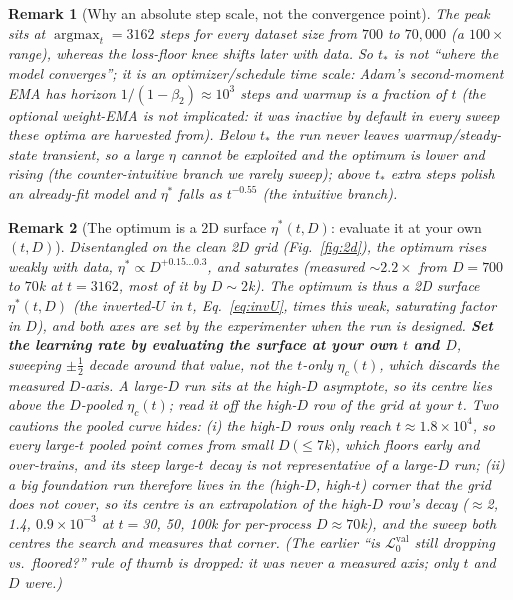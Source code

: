\documentclass[11pt]{article}
\newcommand{\vlnr}{\mathcal{L}^{\mathrm{val}}_{0}}   %
\newcommand{\tstar}{t_\ast}
\newtheorem{remark}{Remark}
\begin{document}
\begin{remark}[Why an absolute step scale, not the convergence point]
The peak sits at $\operatorname{argmax}_t = 3162$ steps for \emph{every} dataset size from
$700$ to $70{,}000$ (a $100\times$ range), whereas the loss-floor knee shifts \emph{later}
with data. So $\tstar$ is not ``where the model converges''; it is an optimizer/schedule
time scale: Adam's second-moment EMA has horizon $1/(1-\beta_2)\approx10^{3}$ steps and warmup
is a fraction of $t$ (the optional weight-EMA is \emph{not} implicated: it was inactive by
default in every sweep these optima are harvested from). Below
$\tstar$ the run never leaves warmup/steady-state transient, so a large $\eta$ cannot be
exploited and the optimum is \emph{lower} and rising (the counter-intuitive branch we rarely
sweep); above $\tstar$ extra steps polish an already-fit model and $\eta^\ast$ falls as
$t^{-0.55}$ (the intuitive branch).
\end{remark}

\begin{remark}[The optimum is a 2D surface $\eta^\ast(t,D)$: evaluate it at your own $(t,D)$]
Disentangled on the clean 2D grid (Fig.~\ref{fig:2d}), the optimum rises \emph{weakly} with
data, $\eta^\ast\propto D^{+0.15\ldots0.3}$, and \emph{saturates} (measured $\sim\!2.2\times$ from
$D=700$ to $70$k at $t=3162$, most of it by $D\!\sim\!2$k). The optimum is thus a 2D surface
$\eta^\ast(t,D)$ (the inverted-$U$ in $t$, Eq.~\eqref{eq:invU}, times this weak, saturating
factor in $D$), and both axes are set by the experimenter when the run is designed.
\textbf{Set the learning rate by evaluating the surface at your own $t$ and $D$}, sweeping
$\pm\tfrac12$ decade around that value, not the $t$-only $\eta_c(t)$, which discards the
measured $D$-axis. A large-$D$ run sits at the high-$D$ asymptote, so its centre lies
\emph{above} the $D$-pooled $\eta_c(t)$; read it off the high-$D$ row of the grid at your $t$.
Two cautions the pooled curve hides: (i) the high-$D$ rows only reach $t\approx1.8\times10^{4}$,
so every large-$t$ pooled point comes from \emph{small} $D\ (\le7$k$)$, which floors early and
over-trains, and its steep large-$t$ decay is not representative of a large-$D$ run; (ii) a big
foundation run therefore lives in the (high-$D$, high-$t$) corner that the grid does not cover,
so its centre is an \emph{extrapolation} of the high-$D$ row's decay ($\approx$2, 1.4,
$0.9\times10^{-3}$ at $t=$30, 50, 100k for per-process $D\!\approx\!70$k), and the sweep both
centres the search and \emph{measures} that corner. (The earlier ``is $\vlnr$ still dropping
vs.\ floored?'' rule of thumb is dropped: it was never a measured axis; only $t$ and $D$
were.)
\end{remark}
\end{document}
